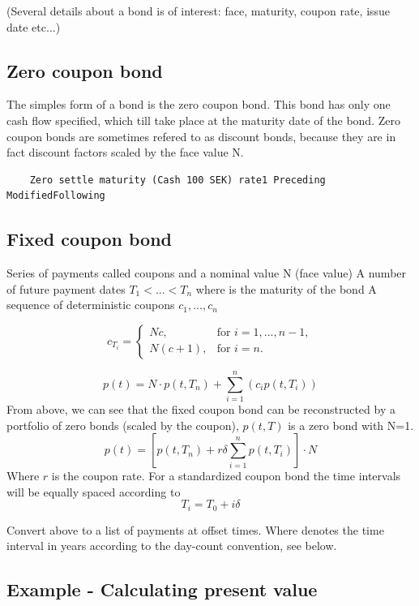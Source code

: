 \documentclass[11pt,a4paper]{article}
\numberwithin{equation}{section}
\begin{document}
	(Several details about a bond is of interest: face, maturity, coupon rate, issue date etc...)

	\label{sec:fi}

	\subsection{Zero coupon bond}
	The simples form of a bond is the zero coupon bond. This bond has only one cash flow specified, which till take place at the maturity date of the bond. Zero coupon bonds are sometimes refered to as discount bonds, because they are in fact discount factors scaled by the face value N.

	\FrameSep
	\begin{lstlisting}
	Zero settle maturity (Cash 100 SEK) rate1 Preceding ModifiedFollowing
	\end{lstlisting}
	\FrameSep


	\subsection{Fixed coupon bond}
	Series of payments called coupons and a nominal value N (face value)
	A number of future payment dates $T_1 < ... < T_n$ where is the maturity of the bond
	A sequence of deterministic coupons $c_1, ..., c_n$

	\[ c_{T_i} = \left\{
	\begin{array}{ll}
	  Nc, & \text{for } i=1,...,n-1,  \\
	  N(c+1), &\text{for } i=n.
	\end{array} \right.\]

	\[
	p(t) = N \cdot p(t,T_n)+\sum_{i=1}^{n} (c_ip(t,T_i))
	\]
	From above, we can see that the fixed coupon bond can be reconstructed by a portfolio of zero
	bonds (scaled by the coupon), $p(t,T)$ is a zero bond with N=1.
	\[
	p(t)=\left[p(t,T_n)+r\delta\sum_{i=1}^{n} p(t,T_i)\right]\cdot N
	\]
	Where $r$ is the coupon rate. For a standardized coupon bond the time intervals will be equally
	spaced according to
	\[
	T_i=T_0+i\delta
	\]

	Convert above to a list of payments at offset times. Where denotes the time interval in years
	according to the day-count convention, see below.

	\subsection{Example - Calculating present value}
\end{document}
